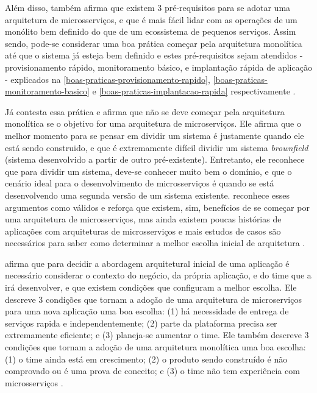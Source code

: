 Além disso,  também afirma que existem 3 pré-requisitos para se adotar uma arquitetura de microsserviços, e que é mais fácil lidar com as operações de um monólito bem definido do que de um ecossistema de pequenos serviços. Assim sendo, pode-se considerar uma boa prática começar pela arquitetura monolítica até que o sistema já esteja bem definido e estes pré-requisitos sejam atendidos - provisionamento rápido, monitoramento básico, e implantação rápida de aplicação - explicados na \autoref{boas-praticas-provisionamento-rapido}, \autoref{boas-praticas-monitoramento-basico} e \autoref{boas-praticas-implantacao-rapida} respectivamente \cite{martin-fowler-microservice-prereq}.

Já  contesta essa prática e afirma que não se deve começar pela arquitetura monolítica se o objetivo for uma arquitetura de microserviços. Ele afirma que o melhor momento para se pensar em dividir um sistema é justamente quando ele está sendo construido, e que é extremamente difícil dividir um sistema \emph{brownfield} (sistema desenvolvido a partir de outro pré-existente). Entretanto, ele reconhece que para dividir um sistema, deve-se conhecer muito bem o domínio, e que o cenário ideal para o desenvolvimento de microsserviços é quando se está desenvolvendo uma segunda versão de um sistema existente.  reconhece esses argumentos como válidos e reforça que existem, sim, benefícios de se começar por uma arquitetura de microsserviços, mas ainda existem poucas histórias de aplicações com arquiteturas de microsserviços e mais estudos de casos são necessários para saber como determinar a melhor escolha inicial de arquitetura \cite{dontStartWithMonolith-tilkov,martin-fowler-monolith-first}.


 afirma que para decidir a abordagem arquitetural inicial de uma aplicação é necessário considerar o contexto do negócio, da própria aplicação, e do time que a irá desenvolver, e que existem condições que configuram a melhor escolha. Ele descreve 3 condições que tornam a adoção de uma arquitetura de microserviços para uma nova aplicação uma boa escolha: (1) há necessidade de entrega de serviços rapida e independentemente; (2) parte da plataforma precisa ser extremamente eficiente; e (3) planeja-se aumentar o time. Ele também descreve 3 condições que tornam a adoção de uma arquitetura monolítica uma boa escolha: (1) o time ainda está em crescimento; (2) o produto sendo construído é não comprovado ou é uma prova de conceito; e (3) o time não tem experiência com microsserviços \cite{monolith-or-microservices}.

